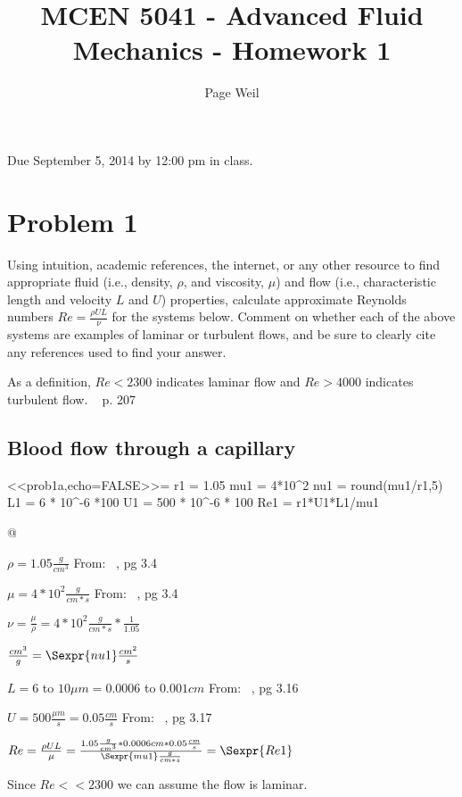 \documentclass{article}
\begin{document}
\title{MCEN 5041 - Advanced Fluid Mechanics - Homework 1}

\author{Page Weil}
\maketitle
\title{}

Due September 5, 2014 by 12:00 pm in class.

\section*{Problem 1}

Using intuition, academic references, the internet, or any other resource to
find appropriate fluid (i.e., density, $\rho$, and viscosity, $\mu$) and flow (i.e.,
characteristic length and velocity $L$ and $U$) properties, calculate
approximate Reynolds numbers $Re = \frac{\rho UL}{\nu}$ for the systems below.
 Comment on whether each of the above systems are examples of laminar or
turbulent flows, and be sure to clearly cite any references used to find your answer.

As a definition,  $Re < 2300$ indicates laminar flow and $Re > 4000$
indicates turbulent flow. ~\cite{Holman2002} p. 207

\subsection*{Blood flow through a capillary}

<<prob1a,echo=FALSE>>=
r1 = 1.05
mu1 = 4*10^2
nu1 = round(mu1/r1,5)
L1 = 6 * 10^-6 *100
U1 = 500 * 10^-6 * 100
Re1 = r1*U1*L1/mu1
		
@

$\rho = 1.05 \frac{g}{cm^{3}}$ From: ~\cite{Kutz2003}, pg 3.4

$\mu = 4 * 10^{2} \frac{g}{cm*s}$  From: ~\cite{Kutz2003}, pg 3.4

$\nu = \frac{\mu}{\rho} = 4*10^{2} \frac{g}{cm*s} * \frac{1}{1.05}$

$\frac{cm^{3}}{g} = \Sexpr{nu1} \frac{cm^{2}}{s}$

$L = 6$ to $10 \mu m = 0.0006$ to $0.001 cm$ From: ~\cite{Kutz2003}, pg 3.16

$U = 500 \frac{\mu m}{s} = 0.05 \frac{cm}{s}$ From: ~\cite{Kutz2003}, pg 3.17

$Re = \frac{\rho UL}{\mu} = \frac{1.05 \frac{g}{cm^{3}}*0.0006 cm * 0.05
\frac{cm}{s}}{\Sexpr{mu1} \frac{g}{cm*s}} = \Sexpr{Re1}$

Since $Re << 2300$ we can assume the flow is laminar.
\end{document}
